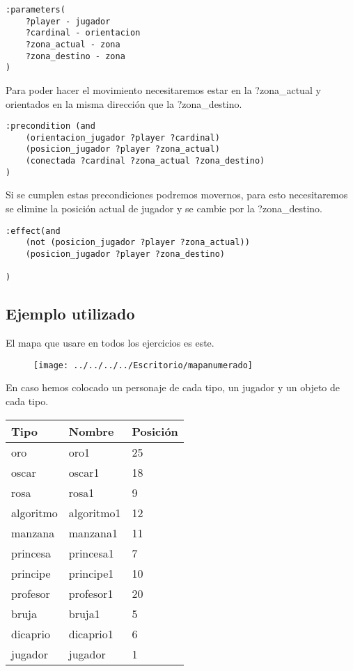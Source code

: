\documentclass[]{article}
\begin{document}
\begin{enumerate}
\begin{lstlisting}
:parameters(
	?player - jugador 
	?cardinal - orientacion 
	?zona_actual - zona 
	?zona_destino - zona 
)
\end{lstlisting}

Para poder hacer el movimiento necesitaremos estar en la ?zona\_actual y orientados en la misma dirección que la ?zona\_destino. 

\begin{lstlisting}
:precondition (and 
	(orientacion_jugador ?player ?cardinal)
	(posicion_jugador ?player ?zona_actual)
	(conectada ?cardinal ?zona_actual ?zona_destino)
)
\end{lstlisting}

Si se cumplen estas precondiciones podremos movernos, para esto necesitaremos se elimine la posición actual de jugador y se cambie por la ?zona\_destino.

\begin{lstlisting}
:effect(and 
	(not (posicion_jugador ?player ?zona_actual))
	(posicion_jugador ?player ?zona_destino)

)
\end{lstlisting}
\end{enumerate}
\newpage
\subsection{Ejemplo utilizado}
El mapa que usare en todos los ejercicios es este.

\begin{figure}[H]
	\centering
	\texttt{[image: ../../../../Escritorio/mapanumerado]}
	\caption{}
	\label{fig:mapanumerado}
\end{figure}


En caso hemos colocado un personaje de cada tipo, un jugador y un objeto de cada tipo.

\begin{table}[htbp]
	\begin{center}
		\begin{tabular}{|l|l|l|}
			\hline
			Tipo & Nombre & Posición \\
			\hline \hline
			oro & oro1 & 25 \\ \hline
			oscar & oscar1 & 18\\ \hline
			rosa & rosa1 & 9\\ \hline
			algoritmo & algoritmo1 & 12 \\ \hline
			manzana & manzana1 & 11\\ \hline
			princesa & princesa1 & 7 \\ \hline
			 principe & principe1 & 10 \\ \hline
			  profesor & profesor1 & 20  \\ \hline
			   bruja & bruja1 & 5 \\ \hline
			   dicaprio  & dicaprio1& 6 \\ \hline
			     jugador & jugador & 1 \\ \hline

		\end{tabular}
	\end{center}
\end{table}
\end{document}

